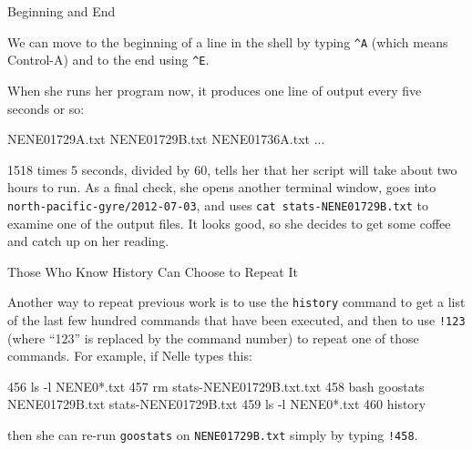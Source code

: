 \documentclass{book}
\begin{document}
\begin{swcbox}{Beginning and End}

We can move to the beginning of a line in the shell by typing
\texttt{\^{}A} (which means Control-A) and to the end using
\texttt{\^{}E}.

\end{swcbox}

When she runs her program now, it produces one line of output every five
seconds or so:

\begin{VerbOut}
NENE01729A.txt
NENE01729B.txt
NENE01736A.txt
...
\end{VerbOut}

1518 times 5 seconds, divided by 60, tells her that her script will take
about two hours to run. As a final check, she opens another terminal
window, goes into \texttt{north-pacific-gyre/2012-07-03}, and uses
\texttt{cat stats-NENE01729B.txt} to examine one of the output files. It
looks good, so she decides to get some coffee and catch up on her
reading.

\begin{swcbox}{Those Who Know History Can Choose to Repeat It}

Another way to repeat previous work is to use the \texttt{history}
command to get a list of the last few hundred commands that have been
executed, and then to use \texttt{!123} (where ``123'' is replaced by
the command number) to repeat one of those commands. For example, if
Nelle types this:


\begin{VerbOut}
  456  ls -l NENE0*.txt
  457  rm stats-NENE01729B.txt.txt
  458  bash goostats NENE01729B.txt stats-NENE01729B.txt
  459  ls -l NENE0*.txt
  460  history
\end{VerbOut}

then she can re-run \texttt{goostats} on \texttt{NENE01729B.txt} simply
by typing \texttt{!458}.

\end{swcbox}
\end{document}
